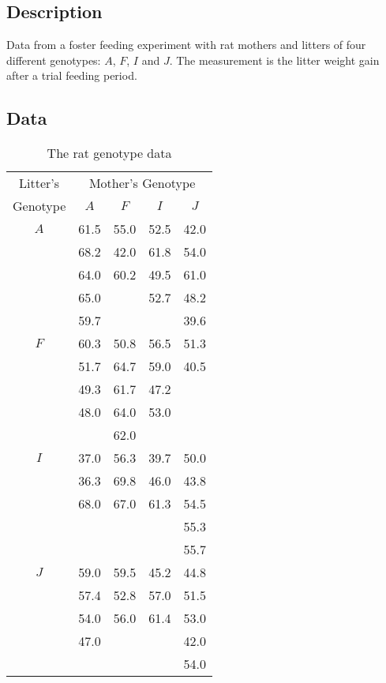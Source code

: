 \documentclass{article}
\newcommand{\strutt}{\vrule height 2.5ex depth 0.5ex width 0ex}%
\begin{document}
\subsection*{Description}
Data from a foster feeding experiment with rat mothers and litters of four
different genotypes: $A$, $F$, $I$ and $J$.  The measurement is the litter
weight gain after a trial feeding period.

\subsection*{Data}

\begin{table}[ht]
\begin{center}
\begin{tabular}{@{\protect\strutt}|c|cccc|}
\hline
Litter's&\multicolumn{4}{c|}{Mother's Genotype}\\
Genotype &   $A$     &       $F$    &        $I$     &       $J$   \\
\hline
$A$     & 61.5    &     55.0   &      52.5    &     42.0  \\
        & 68.2    &     42.0   &      61.8    &     54.0  \\
        & 64.0    &     60.2   &      49.5    &     61.0  \\
        & 65.0    &            &      52.7    &     48.2  \\
        & 59.7    &            &              &     39.6  \\
\hline
$F$     & 60.3    &     50.8   &      56.5    &     51.3  \\
        & 51.7    &     64.7   &      59.0    &     40.5  \\
        & 49.3    &     61.7   &      47.2    &           \\
        & 48.0    &     64.0   &      53.0    &           \\
        &         &     62.0   &              &           \\
\hline
$I$     & 37.0    &     56.3   &      39.7    &     50.0  \\
        & 36.3    &     69.8   &      46.0    &     43.8  \\
        & 68.0    &     67.0   &      61.3    &     54.5  \\
        &         &            &              &     55.3  \\
        &         &            &              &     55.7  \\
\hline
$J$     & 59.0    &     59.5   &      45.2    &     44.8  \\
        & 57.4    &     52.8   &      57.0    &     51.5  \\
        & 54.0    &     56.0   &      61.4    &     53.0  \\
        & 47.0    &            &              &     42.0  \\
        &         &            &              &     54.0  \\
\hline
\end{tabular}
\end{center}
\caption{\label{genotype} The rat genotype data}
\end{table}
\end{document}
